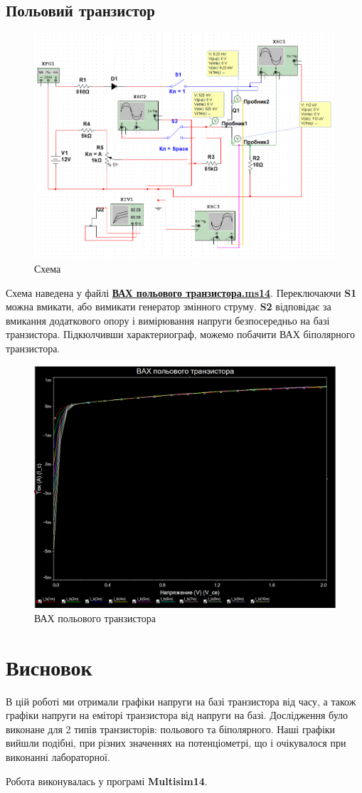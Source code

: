 \documentclass[
  ukrainian,
  14pt
]{extreport}
\begin{document}
\subsection{Польовий транзистор}
\begin{figure}[H]
    \centering
    \includegraphics[width=.7\textwidth]{imgs/p-1.png}
    \caption{Схема}
\end{figure}
Схема наведена у файлі \textbf{\underline{ВАХ польового транзистора.ms14}}.
Переключаючи \textbf{S1} можна вмикати, або вимикати генератор змінного струму. \textbf{S2} відповідає за вмикання додаткового опору і вимірювання напруги безпосередньо на базі транзистора. Підкюлчивши характериограф, можемо побачити ВАХ біполярного транзистора.
\begin{figure}[H]
    \centering
    \includegraphics[width=.7\textwidth]{imgs/p-5.png}
    \caption{ВАХ польового транзистора}
\end{figure}


\section{Висновок}
В цій роботі ми отримали графіки напруги на базі транзистора від часу, а
також графіки напруги на еміторі транзистора від напруги на базі.
Дослідження було виконане для 2 типів транзисторів: польового та
біполярного.
Наші графіки вийшли подібні, при різних значеннях на потенціометрі, що і
очікувалося при виконанні лабораторної. 

Робота виконувалась у програмі \textbf{Multisim14}.
\end{document}
